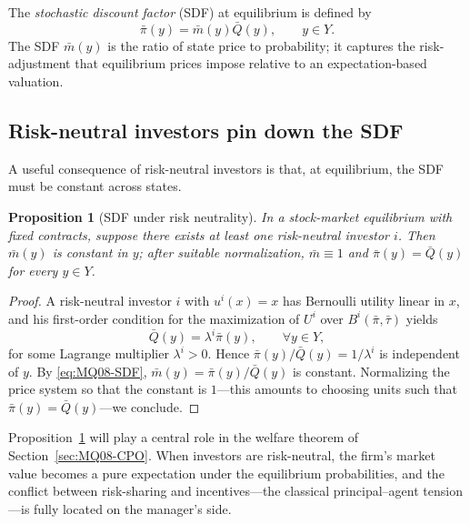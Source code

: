 \documentclass[11pt,a4paper,oneside]{book}
\theoremstyle{plain}
\newtheorem{proposition}[theorem]{Proposition}
\theoremstyle{definition}
\theoremstyle{remark}
\numberwithin{equation}{chapter}
\begin{document}
The \emph{stochastic discount factor} (SDF) at equilibrium is defined by
\begin{equation}\label{eq:MQ08-SDF}
  \bar{\pi}(y) = \bar{m}(y) \bar{Q}(y), \qquad y \in Y.
\end{equation}
The SDF $\bar{m}(y)$ is the ratio of state price to probability; it captures the risk-adjustment that equilibrium prices impose relative to an expectation-based valuation.

\subsection{Risk-neutral investors pin down the SDF}

A useful consequence of risk-neutral investors is that, at equilibrium, the SDF must be constant across states.

\begin{proposition}[SDF under risk neutrality]\label{prop:SDF-risk-neutral}
In a stock-market equilibrium with fixed contracts, suppose there exists at least one risk-neutral investor $i$.
Then $\bar{m}(y)$ is constant in $y$; after suitable normalization, $\bar{m} \equiv 1$ and $\bar{\pi}(y) = \bar{Q}(y)$ for every $y \in Y$.
\end{proposition}

\begin{proof}
A risk-neutral investor $i$ with $u^i(x) = x$ has Bernoulli utility linear in $x$, and his first-order condition for the maximization of $U^i$ over $B^i(\bar{\pi}, \bar{\tau})$ yields
\begin{equation*}
  \bar{Q}(y) = \lambda^i \bar{\pi}(y), \qquad \forall y \in Y,
\end{equation*}
for some Lagrange multiplier $\lambda^i > 0$.
Hence $\bar{\pi}(y) / \bar{Q}(y) = 1 / \lambda^i$ is independent of $y$.
By \eqref{eq:MQ08-SDF}, $\bar{m}(y) = \bar{\pi}(y) / \bar{Q}(y)$ is constant.
Normalizing the price system so that the constant is $1$---this amounts to choosing units such that $\bar{\pi}(y) = \bar{Q}(y)$---we conclude.
\end{proof}

Proposition~\ref{prop:SDF-risk-neutral} will play a central role in the welfare theorem of Section~\ref{sec:MQ08-CPO}.
When investors are risk-neutral, the firm's market value becomes a pure expectation under the equilibrium probabilities, and the conflict between risk-sharing and incentives---the classical principal--agent tension---is fully located on the manager's side.
\end{document}

